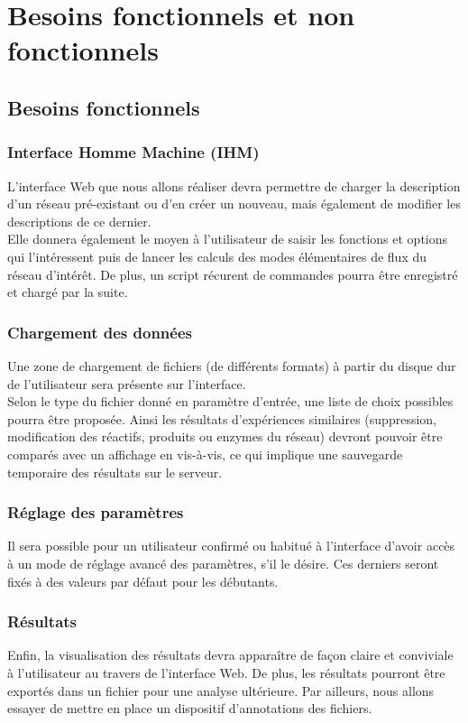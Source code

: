 \chapter{Besoins fonctionnels et non fonctionnels}

\section{Besoins fonctionnels}

\subsection{Interface Homme Machine (IHM)}
L'interface Web que nous allons réaliser devra permettre de charger la description d'un réseau pré-existant ou d'en créer un nouveau, mais également de modifier les descriptions de ce dernier.\\
Elle donnera également le moyen à l'utilisateur de saisir les fonctions et options qui l'intéressent puis de lancer les calculs des modes élémentaires de flux du réseau d'intérêt. De plus, un script récurent de commandes pourra être enregistré et chargé par la suite.

\subsection{Chargement des données}
Une zone de chargement de fichiers (de différents formats) à partir du disque dur de l'utilisateur sera présente sur l'interface. \\
Selon le type du fichier donné en paramètre d'entrée, une liste de choix possibles pourra être proposée. Ainsi les résultats d'expériences similaires (suppression, modification des réactifs, produits ou enzymes du réseau) devront pouvoir être comparés avec un affichage en vis-à-vis, ce qui implique une sauvegarde temporaire des résultats sur le serveur. 

\subsection{Réglage des paramètres}
Il sera possible pour un utilisateur confirmé ou habitué à l'interface d'avoir accès à un mode de réglage avancé des paramètres, s'il le désire. Ces derniers seront fixés à des valeurs par défaut pour les débutants. 

\subsection{Résultats}
Enfin, la visualisation des résultats devra apparaître de façon claire et conviviale à l'utilisateur au travers de l'interface Web. De plus, les résultats pourront être exportés dans un fichier pour une analyse ultérieure. Par ailleurs, nous allons essayer de mettre en place un dispositif d'annotations des fichiers.

